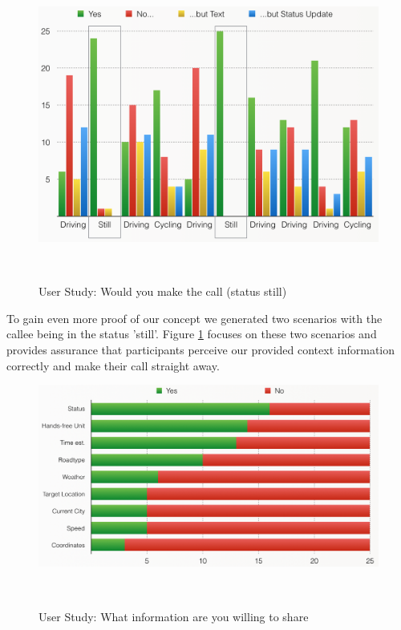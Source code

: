 \documentclass{sigchi}
\begin{document}
\begin{figure}[H]
\centering
  \includegraphics[width=0.9\columnwidth]{figures/WouldYouCall_3}
  \caption{User Study: Would you make the call (status still)}~\label{fig:WouldYouCall_3}
\end{figure}

To gain even more proof of our concept we generated two scenarios with the callee being in the status 'still'. Figure \ref{fig:WouldYouCall_3} focuses on these two scenarios and provides assurance that participants perceive our provided context information correctly and make their call straight away.

\begin{figure}[H]
\centering
  \includegraphics[width=0.9\columnwidth]{figures/WhatAreYouWillingToShare}
  \caption{User Study: What information are you willing to share}~\label{fig:WhatAreYouWillingToShare}
\end{figure}
\end{document}
